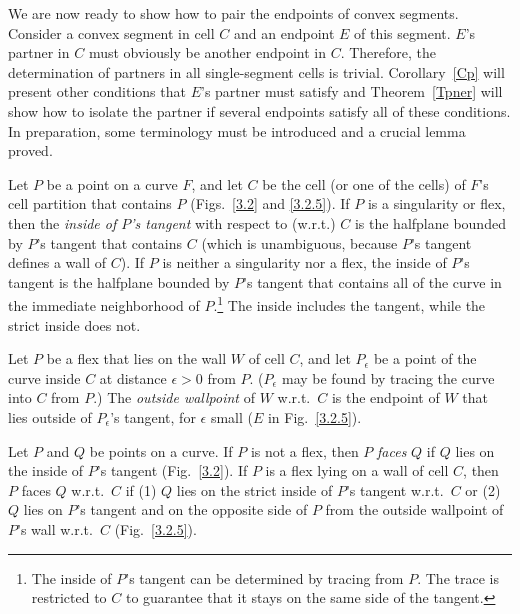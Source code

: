 We are now ready to show how to pair the endpoints of convex segments.
Consider a convex segment in cell $C$ and an endpoint $E$ of this segment.
$E$'s partner in $C$ must obviously be another endpoint in $C$.
Therefore, the determination of partners in all single-segment cells 
is trivial.
Corollary~\ref{Cp} will present other conditions that $E$'s partner 
must satisfy
and Theorem~\ref{Tpner} will show how to isolate the partner if 
several endpoints
satisfy all of these conditions.
In preparation, some terminology must be introduced and a crucial lemma 
proved.
%
%
\begin{definition}
Let $P$ be a point on a curve $F$, and let $C$ be the cell (or one
of the cells) of $F$'s cell partition that contains $P$ 
(Figs.~\ref{3.2} and \ref{3.2.5}).
If $P$ is a singularity or flex, then the 
{\em inside of $P$'s tangent} with respect to (w.r.t.) $C$ is the 
halfplane bounded by $P$'s tangent that contains $C$ (which is 
unambiguous, because $P$'s 
tangent defines a wall of $C$).  
If $P$ is neither a singularity nor a flex, 
the inside of $P$'s tangent is the halfplane bounded by $P$'s tangent that 
contains all of the curve in the immediate neighborhood 
of $P$.\footnote{The 
	inside of $P$'s tangent
	can be determined by tracing from $P$.
	The trace is restricted to $C$
	to guarantee that it stays on the same side of the tangent.}
The inside includes the tangent, while the strict inside does not.

Let $P$ be a flex that lies on the wall $W$ of cell $C$, and 
let $P_{\epsilon}$ be a point of the curve inside $C$ at distance
$\epsilon > 0$ from $P$.
($P_{\epsilon}$ may be found by tracing the curve into $C$ from $P$.)
The {\em outside wallpoint} of $W$ w.r.t.\ $C$ is the endpoint of $W$ that 
lies outside of $P_{\epsilon}$'s tangent, for $\epsilon$ 
small ($E$ in Fig.~\ref{3.2.5}).

Let $P$ and $Q$ be points on a curve.
If $P$ is not a flex, then $P$ {\em faces} $Q$ if $Q$ lies on the inside of 
$P$'s tangent (Fig.~\ref{3.2}).
If $P$ is a flex lying on a wall of cell $C$, then
$P$ faces $Q$ w.r.t.\ $C$ if (1) $Q$ lies on the strict inside of $P$'s 
tangent 
w.r.t.\ $C$ or (2) $Q$ lies on $P$'s tangent and on the opposite side 
of $P$ from 
the outside wallpoint of $P$'s wall w.r.t.\ $C$ (Fig.~\ref{3.2.5}).
\end{definition}

